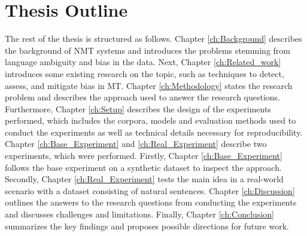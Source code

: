 \section{Thesis Outline}
\label{sec:Introduction:Outline}
The rest of the thesis is structured as follows. 
Chapter \ref{ch:Background} describes the background of NMT systems and introduces the problems stemming from language ambiguity and bias in the data. 
Next, Chapter \ref{ch:Related_work} introduces some existing research on the topic, such as techniques to detect, assess, and mitigate bias in MT. 
Chapter \ref{ch:Methodology} states the research problem and describes the approach used to answer the research questions. 
Furthermore, Chapter \ref{ch:Setup} describes the design of the experiments performed, which includes the corpora, models and evaluation methods used to conduct the experiments as well as technical details necessary for reproducibility. 
Chapter \ref{ch:Base_Experiment} and \ref{ch:Real_Experiment} describe two experiments, which were performed. Firstly, Chapter \ref{ch:Base_Experiment} follows the base experiment on a synthetic dataset to inspect the approach. Secondly, Chapter \ref{ch:Real_Experiment} tests the main idea in a real-world scenario with a dataset consisting of natural sentences.
Chapter \ref{ch:Discussion} outlines the answers to the research questions from conducting the experiments and discusses challenges and limitations. 
Finally, Chapter \ref{ch:Conclusion} summarizes the key findings and proposes possible directions for future work.